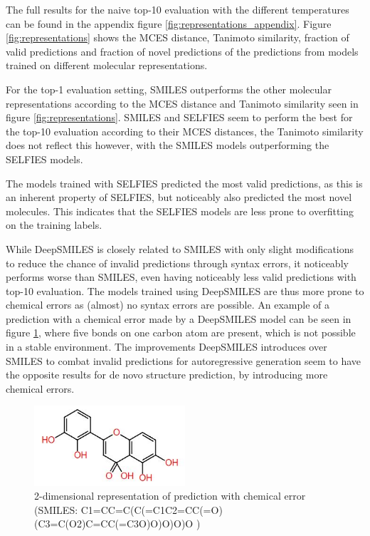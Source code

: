 The full results for the naive top-10 evaluation with the different temperatures can be found in the appendix figure \ref{fig:representations_appendix}.
Figure \ref{fig:representations} shows the MCES distance, Tanimoto similarity, fraction of valid predictions and fraction of novel predictions of the predictions from models trained on different molecular representations.

For the top-1 evaluation setting, SMILES outperforms the other molecular representations according to the MCES distance and Tanimoto similarity seen in figure \ref{fig:representations}.
SMILES and SELFIES seem to perform the best for the top-10 evaluation according to their MCES distances, the Tanimoto similarity does not reflect this however, with the SMILES models outperforming the SELFIES models.

The models trained with SELFIES predicted the most valid predictions, as this is an inherent property of SELFIES, but noticeably also predicted the most novel molecules.
This indicates that the SELFIES models are less prone to overfitting on the training labels.

While DeepSMILES is closely related to SMILES with only slight modifications to reduce the chance of invalid predictions through syntax errors, it noticeably performs worse than SMILES, even having noticeably less valid predictions with top-10 evaluation.
The models trained using DeepSMILES are thus more prone to chemical errors as (almost) no syntax errors are possible.
An example of a prediction with a chemical error made by a DeepSMILES model can be seen in figure \ref{fig:invalid_pred}, where five bonds on one carbon atom are present, which is not possible in a stable environment.
The improvements DeepSMILES introduces over SMILES to combat invalid predictions for autoregressive generation seem to have the opposite results for de novo structure prediction, by introducing more chemical errors.
\begin{figure}[h]
    \centering
    \includegraphics[width=0.5\textwidth]{figures/results/invalid_pred.JPG}
    \caption{2-dimensional representation of prediction with chemical error (SMILES: C1=CC=C(C(=C1C2=CC(=O)(C3=C(O2)C=CC(=C3O)O)O)O)O )}
    \label{fig:invalid_pred}
\end{figure}

